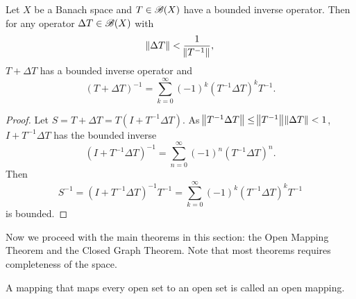 \begin{cor}
\label{cor:bounded_linear_operators:t_plus_delta_t_invertible}
Let $X$ be a Banach space and $T \in \mathscr{B}(X)$ have a bounded inverse operator. 
Then for any operator $\Delta T \in \mathscr{B}(X)$ with 
\begin{equation*}
    \norm{\Delta T} < \frac{1}{\norm{T^{-1}}}, 
\end{equation*}
$T + \Delta T$ has a bounded inverse operator and 
\begin{equation*}
    (T + \Delta T)^{-1} = \sum_{k=0}^{\infty} (-1)^k 
        \left( T^{-1} \Delta T \right)^k T^{-1}. 
\end{equation*}
\end{cor}
\begin{proof}
Let $S = T + \Delta T = T (I + T^{-1} \Delta T)$. 
As $\norm{T^{-1}\Delta T} \le \norm{T ^{-1}} \norm{\Delta T} < 1$, 
$I + T ^{-1} \Delta T$ has the bounded inverse 
\begin{equation*}
    \left( I + T ^{-1} \Delta T \right) ^{-1} 
    = \sum_{n=0}^{\infty} (-1)^n \left( T ^{-1} \Delta T \right)^n. 
\end{equation*}
Then 
\begin{equation*}
    S ^{-1} = \left( I + T ^{-1} \Delta T \right) ^{-1} T ^{-1} 
    = \sum_{k=0}^{\infty} (-1)^k \left( T ^{-1} \Delta T \right)^k T ^{-1} 
\end{equation*}
is bounded. 
\end{proof}

Now we proceed with the main theorems in this section: the Open Mapping 
Theorem and the Closed Graph Theorem. 
Note that most theorems requires completeness of the space. 

\begin{defn}
A mapping that maps every open set to an open set is called an open mapping. 
\end{defn}

